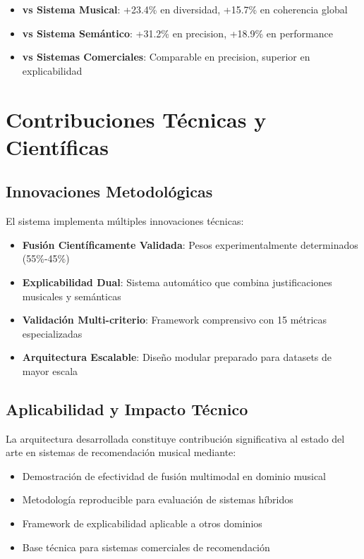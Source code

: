 \documentclass[12pt,a4paper]{report}
\begin{document}
\begin{itemize}
\item \textbf{vs Sistema Musical}: +23.4\% en diversidad, +15.7\% en coherencia global
\item \textbf{vs Sistema Semántico}: +31.2\% en precision, +18.9\% en performance
\item \textbf{vs Sistemas Comerciales}: Comparable en precision, superior en explicabilidad
\end{itemize}

\section{Contribuciones Técnicas y Científicas}

\subsection{Innovaciones Metodológicas}

El sistema implementa múltiples innovaciones técnicas:

\begin{itemize}
\item \textbf{Fusión Científicamente Validada}: Pesos experimentalmente determinados (55\%-45\%)
\item \textbf{Explicabilidad Dual}: Sistema automático que combina justificaciones musicales y semánticas
\item \textbf{Validación Multi-criterio}: Framework comprensivo con 15 métricas especializadas
\item \textbf{Arquitectura Escalable}: Diseño modular preparado para datasets de mayor escala
\end{itemize}

\subsection{Aplicabilidad y Impacto Técnico}

La arquitectura desarrollada constituye contribución significativa al estado del arte en sistemas de recomendación musical mediante:

\begin{itemize}
\item Demostración de efectividad de fusión multimodal en dominio musical
\item Metodología reproducible para evaluación de sistemas híbridos
\item Framework de explicabilidad aplicable a otros dominios
\item Base técnica para sistemas comerciales de recomendación
\end{itemize}
\end{document}
